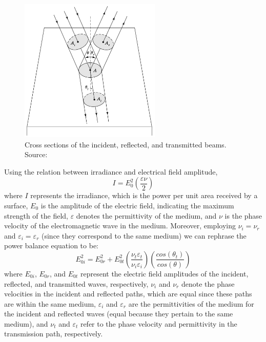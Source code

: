\begin{figure}[ht!]
  \centering
  \includegraphics[width=0.6\textwidth]{Chapters/Figures/Chapter 2 Figures/CSA Example for the Incident, Reflected, and Transmitted Electromagnetic Waves.jpg}
  \caption[Cross sections of the incident, reflected, and transmitted beams]{Cross sections of the incident, reflected, and transmitted beams. Source: \cite{pedrotti_introduction_2007}}
  \label{fig: The CSA Example}
\end{figure}

Using the relation between irradiance and electrical field amplitude, 
\begin{equation}\label{eq: definition of irradiance}
I = E_{0}^2(\frac{\varepsilon \nu}{2})
\end{equation} where $I$ represents the irradiance, which is the power per unit area received by a surface, $E_0$ is the amplitude of the electric field, indicating the maximum strength of the field, $\varepsilon$ denotes the permittivity of the medium, and $\nu$ is the phase velocity of the electromagnetic wave in the medium. Moreover, employing $\nu_i = \nu_r$ and $\varepsilon_i = \varepsilon_r$ (since they correspond to the same medium) we can rephrase the power balance equation to be:
\begin{equation}
E_{0i}^2 = E_{0r}^2 + E_{0t}^2\left(\frac{\nu_t\varepsilon_t}{\nu_i\varepsilon_i}\right) \left(\frac{cos(\theta_t)}{cos(\theta)} \right)
\end{equation} where $E_{0i}$, $E_{0r}$, and $E_{0t}$ represent the electric field amplitudes of the incident, reflected, and transmitted waves, respectively, $\nu_i$ and $\nu_r$ denote the phase velocities in the incident and reflected paths, which are equal since these paths are within the same medium, $\varepsilon_i$ and $\varepsilon_r$ are the permittivities of the medium for the incident and reflected waves (equal because they pertain to the same medium), and $\nu_t$ and $\varepsilon_t$ refer to the phase velocity and permittivity in the transmission path, respectively.

